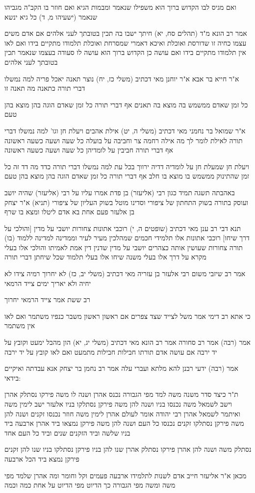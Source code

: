 \documentclass[12pt, openany]{book}
\newcommand{\sethebfont}{
\fontsize{10.5pt}{21.0pt} \selectfont
}
\newcommand{\textblock}[1]{
{\sethebfont #1\\}	
}
\begin{document}
\textblock{ואם מגיס לבו הקדוש ברוך הוא משפילו שנאמר ומבמות הגיא ואם חוזר בו הקב"ה מגביהו שנאמר (ישעיהו מ, ד) כל גיא ינשא}
\textblock{אמר רב הונא מ"ד (תהלים סח, יא) חיתך ישבו בה תכין בטובתך לעני אלהים אם אדם משים עצמו כחיה זו שדורסת ואוכלת ואיכא דאמרי שמסרחת ואוכלת תלמודו מתקיים בידו ואם לאו אין תלמודו מתקיים בידו ואם עושה כן הקדוש ברוך הוא עושה לו סעודה בעצמו שנאמר תכין בטובתך לעני אלהים}
\textblock{א"ר חייא בר אבא א"ר יוחנן מאי דכתיב (משלי כז, יח) נוצר תאנה יאכל פריה למה נמשלו דברי תורה כתאנה מה תאנה זו}
\textblock{כל זמן שאדם ממשמש בה מוצא בה תאנים אף דברי תורה כל זמן שאדם הוגה בהן מוצא בהן טעם}
\textblock{א"ר שמואל בר נחמני מאי דכתיב (משלי ה, יט) אילת אהבים ויעלת חן וגו' למה נמשלו דברי תורה לאילת לומר לך מה אילה רחמה צר וחביבה על בועלה כל שעה ושעה כשעה ראשונה אף דברי תורה חביבין על לומדיהן כל שעה ושעה כשעה ראשונה}
\textblock{ויעלת חן שמעלת חן על לומדיה דדיה ירווך בכל עת למה נמשלו דברי תורה כדד מה דד זה כל זמן שהתינוק ממשמש בו מוצא בו חלב אף דברי תורה כל זמן שאדם הוגה בהן מוצא בהן טעם}
\textblock{באהבתה תשגה תמיד כגון רבי (אליעזר) בן פדת אמרו עליו על רבי (אליעזר) שהיה יושב ועוסק בתורה בשוק התחתון של ציפורי וסדינו מוטל בשוק העליון של ציפורי (תניא) א"ר יצחק בן אלעזר פעם אחת בא אדם ליטלו ומצא בו שרף}
\textblock{תנא דבי רב ענן מאי דכתיב (שופטים ה, י) רוכבי אתונות צחורות יושבי על מדין [והולכי על דרך שיחו] רוכבי אתונות אלו תלמידי חכמים שמהלכין מעיר לעיר וממדינה למדינה ללמוד (בו) תורה צחורות שעושין אותה כצהרים יושבי על מדין שדנין דין אמת לאמיתו והולכי אלו בעלי מקרא על דרך אלו בעלי משנה שיחו אלו בעלי תלמוד שכל שיחתן דברי תורה }
\textblock{אמר רב שיזבי משום רבי אלעזר בן עזריה מאי דכתיב (משלי יב, כז) לא יחרוך רמיה צידו לא יחיה ולא יאריך ימים צייד הרמאי}
\textblock{רב ששת אמר צייד הרמאי יחרוך}
\textblock{כי אתא רב דימי אמר משל לצייד שצד צפרים אם ראשון ראשון משבר כנפיו משתמר ואם לאו אין משתמר}
\textblock{אמר (רבה) אמר רב סחורה אמר רב הונא מאי דכתיב (משלי יג, יא) הון מהבל ימעט וקובץ על יד ירבה אם עושה אדם תורתו חבילות חבילות מתמעט ואם לאו קובץ על יד ירבה}
\textblock{אמר (רבה) ידעי רבנן להא מלתא ועברי עלה אמר רב נחמן בר יצחק אנא עבדתה ואיקיים בידאי:}
\textblock{ת"ר כיצד סדר משנה משה למד מפי הגבורה נכנס אהרן ושנה לו משה פירקו נסתלק אהרן וישב לשמאל משה נכנסו בניו ושנה להן משה פירקן נסתלקו בניו אלעזר ישב לימין משה ואיתמר לשמאל אהרן רבי יהודה אומר לעולם אהרן לימין משה חוזר נכנסו זקנים ושנה להן משה פירקן נסתלקו זקנים נכנסו כל העם ושנה להן משה פירקן נמצאו ביד אהרן ארבעה ביד בניו שלשה וביד הזקנים שנים וביד כל העם אחד}
\textblock{נסתלק משה ושנה להן אהרן פירקו נסתלק אהרן שנו להן בניו פירקן נסתלקו בניו שנו להן זקנים פירקן נמצא ביד הכל ארבעה}
\textblock{מכאן א"ר אליעזר חייב אדם לשנות לתלמידו ארבעה פעמים וקל וחומר ומה אהרן שלמד מפי משה ומשה מפי הגבורה כך הדיוט מפי הדיוט על אחת כמה וכמה}
\end{document}
